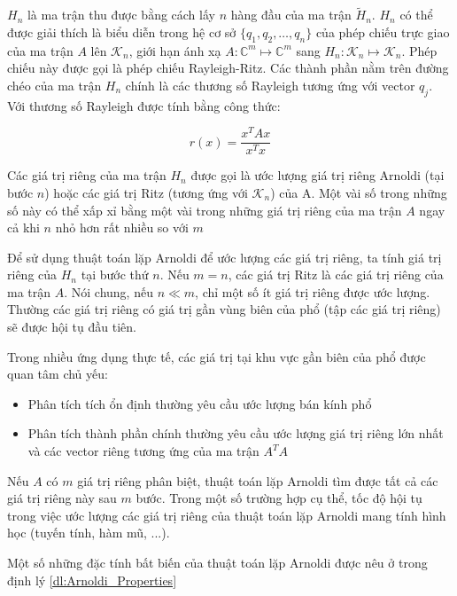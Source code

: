 \documentclass[14pt, a4paper]{article}
\numberwithin{equation}{section}
\numberwithin{algorithm}{section}
\numberwithin{figure}{section}
\numberwithin{dl}{section}
\numberwithin{md}{section}
\numberwithin{bd}{section}
\numberwithin{dn}{section}
\numberwithin{hq}{section}
\begin{document}
$H_n$ là ma trận thu được bằng cách lấy $n$ hàng đầu của ma trận $\widetilde{H}_n$. $H_n$ có thể được giải thích là biểu diễn trong hệ cơ sở $\lbrace q_1, q_2, \dots, q_n \rbrace$ của phép chiếu trực giao của ma trận $A$ lên $\mathcal{K}_n$, giới hạn ánh xạ $A: \mathbb{C}^m \mapsto \mathbb{C}^m$ sang $H_n: \mathcal{K}_n \mapsto \mathcal{K}_n$. Phép chiếu này được gọi là phép chiếu Rayleigh-Ritz.
Các thành phần nằm trên đường chéo của ma trận $H_n$ chính là các thương số Rayleigh tương ứng với vector $q_j$. Với thương số Rayleigh được tính bằng công thức:

\begin{equation}
    r(x) = \dfrac{x^T A x }{x^T x}
\end{equation}

Các giá trị riêng của ma trận $H_n$ được gọi là ước lượng giá trị riêng Arnoldi (tại bước $n$) hoặc các giá trị Ritz (tương ứng với $\mathcal{K}_n$) của A. Một vài số trong những số này có thể xấp xỉ bằng một vài trong những giá trị riêng của ma trận $A$ ngay cả khi $n$ nhỏ hơn rất nhiều so với $m$

Để sử dụng thuật toán lặp Arnoldi để ước lượng các giá trị riêng, ta tính giá trị riêng của $H_n$ tại bước thứ $n$. Nếu $m=n$, các giá trị Ritz là các giá trị riêng của ma trận $A$. Nói chung, nếu $n \ll m$, chỉ một số ít giá trị riêng được ước lượng. Thường các giá trị riêng có giá trị gần vùng biên của phổ (tập các giá trị riêng) sẽ được hội tụ đầu tiên.

Trong nhiều ứng dụng thực tế, các giá trị tại khu vực gần biên của phổ được quan tâm chủ yếu:

\begin{itemize}
    \item Phân tích tích ổn định thường yêu cầu ước lượng bán kính phổ
    \item Phân tích thành phần chính thường yêu cầu ước lượng giá trị riêng lớn nhất và các vector riêng tương ứng của ma trận $A^T A$
\end{itemize}

Nếu $A$ có $m$ giá trị riêng phân biệt, thuật toán lặp Arnoldi tìm được tất cả các giá trị riêng này sau $m$ bước. Trong một số trường hợp cụ thể, tốc độ hội tụ trong việc ước lượng các giá trị riêng của thuật toán lặp Arnoldi mang tính hình học (tuyến tính, hàm mũ, ...).

Một số những đặc tính bất biến của thuật toán lặp Arnoldi được nêu ở trong định lý \ref{dl:Arnoldi_Properties}
\end{document}
